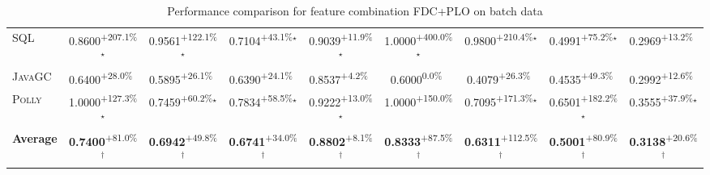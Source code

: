 \begin{table}[htbp]
\begin{tabular}{l|cccc|cccc}
\textsc{SQL} & \cellcolor{green!30}0.8600\textsuperscript{+207.1\%}$^\star$ & \cellcolor{green!30}0.9561\textsuperscript{+122.1\%}$^\star$ & \cellcolor{green!30}0.7104\textsuperscript{+43.1\%}$^\star$ & \cellcolor{green!30}0.9039\textsuperscript{+11.9\%}$^\star$ & \cellcolor{green!30}1.0000\textsuperscript{+400.0\%}$^\star$ & \cellcolor{green!30}0.9800\textsuperscript{+210.4\%}$^\star$ & \cellcolor{green!30}0.4991\textsuperscript{+75.2\%}$^\star$ & \cellcolor{green!30}0.2969\textsuperscript{+13.2\%}$^{\,\,\,}$ \\
\textsc{JavaGC} & \cellcolor{green!30}0.6400\textsuperscript{+28.0\%}$^{\,\,\,}$ & \cellcolor{green!30}0.5895\textsuperscript{+26.1\%}$^{\,\,\,}$ & \cellcolor{green!30}0.6390\textsuperscript{+24.1\%}$^{\,\,\,}$ & \cellcolor{green!30}0.8537\textsuperscript{+4.2\%}$^{\,\,\,}$ & \cellcolor{red!30}0.6000\textsuperscript{0.0\%}$^{\,\,\,}$ & \cellcolor{green!30}0.4079\textsuperscript{+26.3\%}$^{\,\,\,}$ & \cellcolor{green!30}0.4535\textsuperscript{+49.3\%}$^{\,\,\,}$ & \cellcolor{green!30}0.2992\textsuperscript{+12.6\%}$^{\,\,\,}$ \\
\textsc{Polly} & \cellcolor{green!30}1.0000\textsuperscript{+127.3\%}$^\star$ & \cellcolor{green!30}0.7459\textsuperscript{+60.2\%}$^\star$ & \cellcolor{green!30}0.7834\textsuperscript{+58.5\%}$^\star$ & \cellcolor{green!30}0.9222\textsuperscript{+13.0\%}$^\star$ & \cellcolor{green!30}1.0000\textsuperscript{+150.0\%}$^{\,\,\,}$ & \cellcolor{green!30}0.7095\textsuperscript{+171.3\%}$^\star$ & \cellcolor{green!30}0.6501\textsuperscript{+182.2\%}$^\star$ & \cellcolor{green!30}0.3555\textsuperscript{+37.9\%}$^\star$ \\
\hline
\textbf{Average} & \cellcolor{green!30}\textbf{0.7400}\textsuperscript{+81.0\%}$^\dagger$ & \cellcolor{green!30}\textbf{0.6942}\textsuperscript{+49.8\%}$^\dagger$ & \cellcolor{green!30}\textbf{0.6741}\textsuperscript{+34.0\%}$^\dagger$ & \cellcolor{green!30}\textbf{0.8802}\textsuperscript{+8.1\%}$^\dagger$ & \cellcolor{green!30}\textbf{0.8333}\textsuperscript{+87.5\%}$^\dagger$ & \cellcolor{green!30}\textbf{0.6311}\textsuperscript{+112.5\%}$^\dagger$ & \cellcolor{green!30}\textbf{0.5001}\textsuperscript{+80.9\%}$^\dagger$ & \cellcolor{green!30}\textbf{0.3138}\textsuperscript{+20.6\%}$^\dagger$ \\
\hline
\end{tabular}
\caption{Performance comparison for feature combination FDC+PLO on batch data}
\label{tab:combo_FDC_PLO_performance_batch}
\end{table}